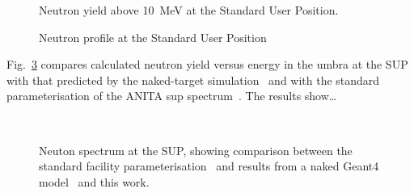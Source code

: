 \documentclass[12pt,journal]{IEEEtran}
\let\MYoriglatexcaption\caption
\renewcommand{\caption}[2][\relax]{\MYoriglatexcaption[#2]{#2}}
\begin{document}
\begin{figure}[t]
    \caption{Neutron yield above \SI{10}{\MeV} at the Standard User Position.}
    \label{fig:SUPCollimator}
\end{figure}

\begin{figure}[t]
    \caption{Neutron profile at the Standard User Position}
    \label{fig:SUPProfile}
\end{figure}

Fig.~\ref{fig:FirstComparison} compares calculated neutron yield versus energy in the umbra at the SUP with that predicted by the naked-target simulation~\cite{Platt13} and with the standard parameterisation of the ANITA sup spectrum~\cite{Prokofiev2009}.
The results show\ldots{}

\begin{figure}[t]
	\\
	\caption{Neuton spectrum at the SUP, showing comparison between the standard facility parameterisation~\cite{Prokofiev2009} and results from a naked Geant4 model~\cite{Platt13} and this work.}
	\label{fig:FirstComparison}
\end{figure}
\end{document}
